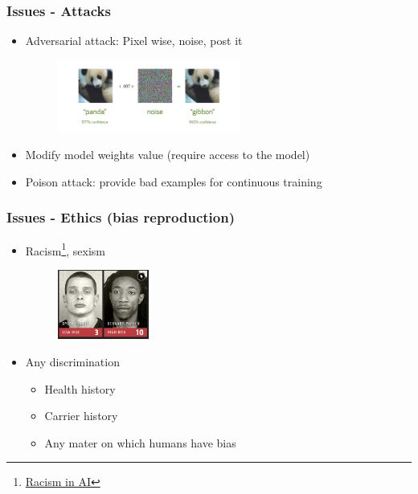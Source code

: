 \begin{frame}\frametitle{Issues - Attacks}
   \begin{itemize}
      \item Adversarial attack: Pixel wise, noise, post it
      \begin{minipage}{0.4\linewidth}
         \begin{figure}[H]
            \includegraphics[width=6cm]{../images/illustrations/adversarial_attack.png}
         \end{figure}
      \end{minipage}
      \item Modify model weights value (require access to the model)
      \item Poison attack: provide bad examples for continuous training
   \end{itemize}
\end{frame}

\begin{frame}\frametitle{Issues - Ethics (bias reproduction)}
   \begin{itemize}
      \item Racism\footnote{\href{https://www.kdnuggets.com/2021/06/ethics-fairness-ai.html}{Racism in AI}}, sexism
      \hspace{20px}
      \begin{minipage}{0.2\linewidth}
         \begin{figure}[H]
            \includegraphics[width=3cm]{../images/illustrations/racism.png}
         \end{figure}
      \end{minipage}

      \item Any discrimination
      \begin{itemize}
         \item Health history
         \item Carrier history
         \item Any mater on which humans have bias
      \end{itemize}
   \end{itemize}
\end{frame}


